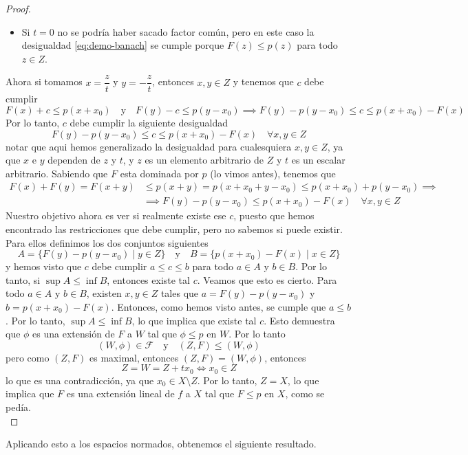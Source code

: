 \begin{teo}
\begin{proof}
\begin{itemize}
        \item Si $t = 0$ no se podría haber sacado factor común, pero en este caso la desigualdad \ref{eq:demo-banach} se cumple porque $F(z) \leq p(z)$ para todo $z \in Z$.
    \end{itemize}
    Ahora si tomamos $x=\dfrac{z}{t}$ y $y=-\dfrac{z}{t}$, entonces $x,y \in Z$ y tenemos que $c$ debe cumplir
    \begin{equation*}
        F(x)+c \leq p(x+ x_0) \quad \text{y} \quad F(y)-c \leq p(y- x_0) \implies F(y)-p(y- x_0)\leq c \leq p(x+ x_0)-F(x) 
    \end{equation*}
    Por lo tanto, $c$ debe cumplir la siguiente desigualdad
    \begin{equation*}        
        F(y)-p(y- x_0)\leq c \leq p(x+ x_0)-F(x) \quad \forall x,y \in Z
    \end{equation*}
    notar que aqui hemos generalizado la desigualdad para cualesquiera $x,y \in Z$, ya que $x$ e $y$ dependen de $z$ y $t$, y $z$ es un elemento arbitrario de $Z$ y $t$ es un escalar arbitrario. Sabiendo que $F$ esta dominada por $p$ (lo vimos antes), tenemos que
    \begin{align*}
        F(x)+F(y)=F(x+y) &\leq p(x+y) = p(x+x_0+y-x_0) \leq p(x+x_0)+p(y-x_0) \implies \\
        & \implies F(y)-p(y- x_0)\leq p(x+ x_0)-F(x) \quad \forall x,y \in Z
    \end{align*}
    Nuestro objetivo ahora es ver si realmente existe ese $c$, puesto que hemos encontrado las restricciones que debe cumplir, pero no sabemos si puede existir. Para ellos definimos los dos conjuntos siguientes
    \begin{equation*}
        A = \{ F(y)-p(y- x_0) \mid y \in Z \} \quad \text{y} \quad B = \{ p(x+ x_0)-F(x) \mid x \in Z \}
    \end{equation*}
    y hemos visto que $c$ debe cumplir $a \leq c \leq b$ para todo $a \in A$ y $b \in B$. Por lo tanto, si $\sup A \leq \inf B$, entonces existe tal $c$. Veamos que esto es cierto. Para todo $a \in A$ y $b \in B$, existen $x,y \in Z$ tales que $a = F(y)-p(y- x_0)$ y $b = p(x+ x_0)-F(x)$. Entonces, como hemos visto antes, se cumple que $a \leq b$. Por lo tanto, $\sup A \leq \inf B$, lo que implica que existe tal $c$. Esto demuestra que $\phi$ es una extensión de $F$ a $W$ tal que $\phi \leq p$ en $W$. Por lo tanto
    \begin{equation*}
        (W, \phi) \in \mathcal{F} \quad \text{y} \quad (Z, F) \leq (W, \phi)
    \end{equation*}
    pero como $(Z, F)$ es maximal, entonces $(Z, F) = (W, \phi)$, entonces
    \begin{equation*}
        Z = W = Z + tx_0 \iff x_0 \in Z
    \end{equation*}
    lo que es una contradicción, ya que $x_0 \in X \setminus Z$. Por lo tanto, $Z = X$, lo que implica que $F$ es una extensión lineal de $f$ a $X$ tal que $F \leq p$ en $X$, como se pedía.  \\
\end{proof}
\end{teo}
\noindent
Aplicando esto a los espacios normados, obtenemos el siguiente resultado.

